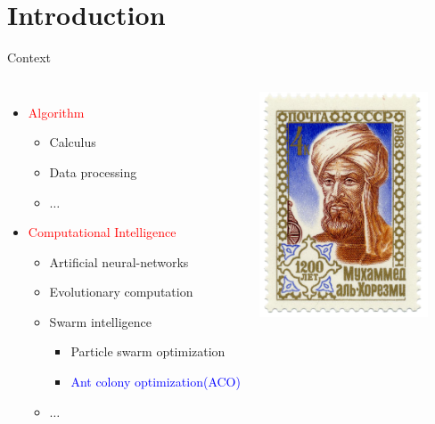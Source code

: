  

\section{Introduction}

\begin{frame}{Context}

\begin{columns}

 \begin{itemize}
  \item \textcolor{red}{Algorithm} %
  \begin{itemize}
   \item Calculus
   \item Data processing
   \item $\dots$
  \end{itemize}
 \item \textcolor{red}{Computational Intelligence}%
 \begin{itemize}
   \item Artificial neural-networks
   \item Evolutionary computation
   \item Swarm intelligence
   \begin{itemize}
     \item Particle swarm optimization
     \item \textcolor{blue}{Ant colony optimization(ACO)}
   \end{itemize}
   \item $\dots$
  \end{itemize}
 \end{itemize}

\begin{center} 
  \includegraphics[width=5cm]{images/al-Khwarizmi.png} 
\end{center} 

\end{columns}

\end{frame}



